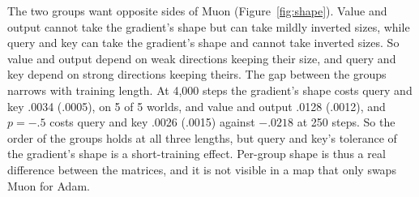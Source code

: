 \documentclass[11pt]{article}
\begin{document}
The two groups want opposite sides of Muon (Figure~\ref{fig:shape}). Value and output cannot take the gradient's shape but can take mildly inverted sizes, while query and key can take the gradient's shape and cannot take inverted sizes. So value and output depend on weak directions keeping their size, and query and key depend on strong directions keeping theirs. The gap between the groups narrows with training length. At 4,000 steps the gradient's shape costs query and key .0034 (.0005), on 5 of 5 worlds, and value and output .0128 (.0012), and $p=-.5$ costs query and key .0026 (.0015) against $-.0218$ at 250 steps. So the order of the groups holds at all three lengths, but query and key's tolerance of the gradient's shape is a short-training effect. Per-group shape is thus a real difference between the matrices, and it is not visible in a map that only swaps Muon for Adam.
\end{document}
